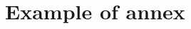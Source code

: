 \documentclass[../main.tex]{subfiles}
\begin{document}
	
	\section{Example of annex}
	\label{sec:annex1}
	
	
\end{document}
